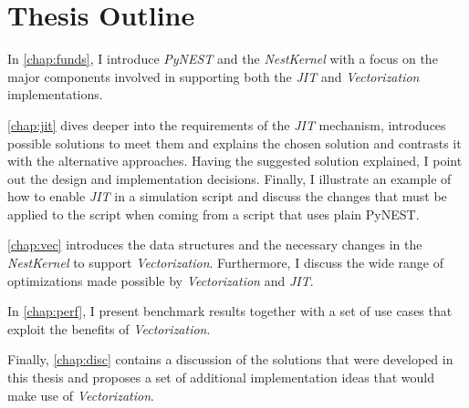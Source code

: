 \section{Thesis Outline}

In \autoref{chap:funds}, I introduce \emph{PyNEST} and the \emph{NestKernel} with a focus on the major components involved in supporting both the \emph{JIT} and \emph{Vectorization} implementations.

\autoref{chap:jit} dives deeper into the requirements of the \emph{JIT} mechanism, introduces possible solutions to meet them and explains the chosen solution and contrasts it with the alternative approaches. Having the suggested solution explained, I point out the design and implementation decisions. Finally, I illustrate an example of how to enable \emph{JIT} in a simulation script and discuss the changes that must be applied to the script when coming from a script that uses plain PyNEST.

\autoref{chap:vec} introduces the data structures and the necessary changes in the \emph{NestKernel} to support \emph{Vectorization}. Furthermore, I discuss the wide range of optimizations made possible by \emph{Vectorization} and \emph{JIT}.

In \autoref{chap:perf}, I present benchmark results together with a set of use cases that exploit the benefits of \emph{Vectorization}.

Finally, \autoref{chap:disc} contains a discussion of the solutions that were developed in this thesis and proposes a set of additional implementation ideas that would make use of \emph{Vectorization}.

\cleardoublepage
